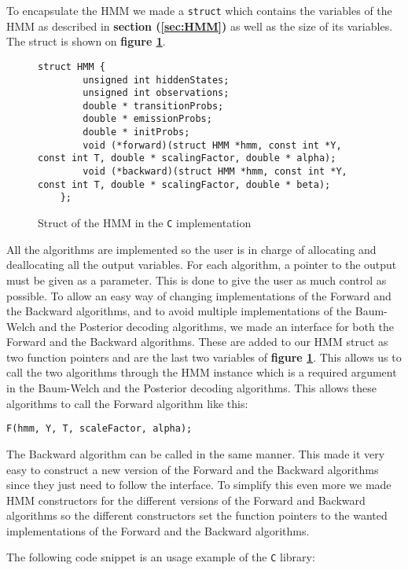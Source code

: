To encapsulate the HMM we made a \texttt{struct} which contains the variables of the HMM as described in \textbf{section (\ref{sec:HMM})} as well as the size of its variables. The struct is shown on \textbf{figure \ref{fig:hmmstruct}}.
\begin{figure}[H]
    \centering
    \begin{lstlisting}[style=CStyle]
    struct HMM {
        unsigned int hiddenStates;
        unsigned int observations;
        double * transitionProbs;
        double * emissionProbs;
        double * initProbs;
        void (*forward)(struct HMM *hmm, const int *Y, const int T, double * scalingFactor, double * alpha);
        void (*backward)(struct HMM *hmm, const int *Y, const int T, double * scalingFactor, double * beta);
    };\end{lstlisting}
    \caption{Struct of the HMM in the \texttt{C} implementation}
    \label{fig:hmmstruct}
\end{figure}
All the algorithms are implemented so the user is in charge of allocating and deallocating all the output variables. For each algorithm, a pointer to the output must be given as a parameter. This is done to give the user as much control as possible.
To allow an easy way of changing implementations of the Forward and the Backward algorithms, and to avoid multiple implementations of the Baum-Welch and the Posterior decoding algorithms, we made an interface for both the Forward and the Backward algorithms. These are added to our HMM struct as two function pointers and are the last two variables of \textbf{figure \ref{fig:hmmstruct}}. This allows us to call the two algorithms through the HMM instance which is a required argument in the Baum-Welch and the Posterior decoding algorithms. This allows these algorithms to call the Forward algorithm like this:
\begin{lstlisting}[style=CStyle]
F(hmm, Y, T, scaleFactor, alpha);\end{lstlisting}

The Backward algorithm can be called in the same manner. 
This made it very easy to construct a new version of the Forward and the Backward algorithms since they just need to follow the interface. To simplify this even more we made HMM constructors for the different versions of the Forward and Backward algorithms so the different constructors set the function pointers to the wanted implementations of the Forward and the Backward algorithms.

The following code snippet is an usage example of the \texttt{C} library:

